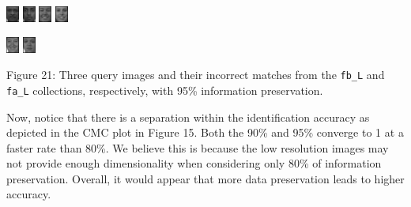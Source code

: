 \documentclass[ 12pt ]{article}
\begin{document}
\begin{enumerate}
\begin{enumerate}
                \begin{center}
                    \includegraphics[scale=5]{f_l_images/AnyConv.com__00183_940128_fb}
                    \includegraphics[scale=5]{f_l_images/AnyConv.com__00618_941031_fa}
                    \includegraphics[scale=5]{f_l_images/AnyConv.com__00451_940422_fb}
                    \includegraphics[scale=5]{f_l_images/AnyConv.com__00411_940422_fa}
                \end{center}
                \begin{center}
                    \includegraphics[scale=5]{f_l_images/AnyConv.com__00557_940519_fb}
                    \includegraphics[scale=5]{f_l_images/AnyConv.com__00276_940422_fa}
                \end{center}
                \begin{center}
                    \scriptsize
                    Figure 21: Three query images and their incorrect matches from the \verb|fb_L| and \verb|fa_L| collections, respectively, with 95\% information
                    preservation.
                \end{center}

                Now, notice that there is a separation within the identification accuracy as depicted in the CMC plot in Figure 15. Both the 90\% and 95\% converge to 1 at a faster
                rate than 80\%. We believe this is because the low resolution images may not provide enough dimensionality when considering only 80\% of information preservation.
                Overall, it would appear that more data preservation leads to higher accuracy.


\end{enumerate}
\end{enumerate}
\end{document}
